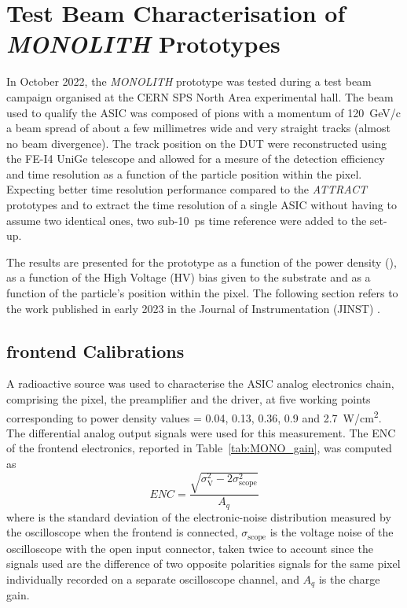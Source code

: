 		
		
		
		
		
		
		
		
		
		
		
		
		
		
		
		
	\clearpage
	\section{Test Beam Characterisation of \textit{MONOLITH} Prototypes}
	In October 2022, the \textit{MONOLITH} prototype was tested during a test beam campaign organised at the CERN SPS North Area experimental hall. The beam used to qualify the ASIC was composed of pions with a momentum of \SI{120}{\giga\electronvolt}/c a beam spread of about a few millimetres wide and very straight tracks (almost no beam divergence). The track position on the DUT were reconstructed using the FE-I4 UniGe telescope \cite{telescope} and allowed for a mesure of the detection efficiency and time resolution as a function of the particle position within the pixel. Expecting better time resolution performance compared to the \textit{ATTRACT} prototypes and to extract the time resolution of a single ASIC without having to assume two identical ones, two sub-\SI{10}{\pico\second} time reference were added to the set-up.  
		
	The results are presented for the prototype as a function of the power density (\power), as a function of the High Voltage (HV) bias given to the substrate and as a function of the particle's position within the pixel. The following section refers to the work published in early 2023 in the Journal of Instrumentation (JINST) \cite{MONOLITH_proto2_20ps}.
		
		\subsection{frontend Calibrations}
		A radioactive \Fe source was used to characterise the ASIC analog electronics chain, comprising the pixel, the preamplifier and the driver, at five working points corresponding to power density values \power = 0.04, 0.13, 0.36, 0.9 and \SI{2.7}{\watt/\centi\meter^2}. The differential analog output signals were used for this measurement.
		The ENC of the frontend electronics, reported in Table~\ref{tab:MONO_gain}, was computed as 
		\begin{equation}
			ENC = \frac{\sqrt{\sigma_{\text{V}}^2 -2\sigma_{\text{scope}}^2}}{A_q}
		\end{equation}
		where \noise is the standard deviation of the electronic-noise distribution measured by the oscilloscope when the frontend is connected, $\sigma_{\text{scope}}$ is the voltage noise of the oscilloscope with the open input connector, taken twice to account since the signals used are the difference of two opposite polarities signals for the same pixel individually recorded on a separate oscilloscope channel, and $A_q$ is the charge gain.
		
